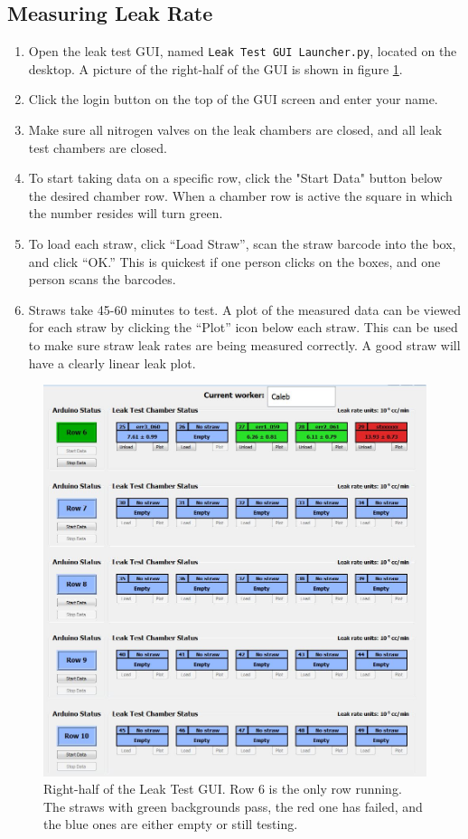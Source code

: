 \documentclass[A4,12pt]{article}
\begin{document}
\subsection{Measuring Leak Rate}
	\begin{enumerate}
    	\item Open the leak test GUI, named {\tt Leak Test GUI Launcher.py}, located on the desktop.  A picture of the right-half of the GUI is shown in figure \ref{GUI}.
        \item Click the login button on the top of the GUI screen and enter your name.
        \item Make sure all nitrogen valves on the leak chambers are closed, and all leak test chambers are closed.
        \item To start taking data on a specific row, click the "Start Data" button below the desired chamber row.  When a chamber row is active the square in which the number resides will turn green.
        \item To load each straw, click ``Load Straw'', scan the straw barcode into the box, and click ``OK.'' This is quickest if one person clicks on the boxes, and one person scans the barcodes.
        \item Straws take 45-60 minutes to test.  A plot of the measured data can be viewed for each straw by clicking the ``Plot'' icon below each straw. This can be used to make sure straw leak rates are being measured correctly. A good straw will have a clearly linear leak plot.
        \end{enumerate}

\begin{figure}[ht]
	\center
	\includegraphics[scale=0.5]{GUI}
	\caption{Right-half of the Leak Test GUI.  Row 6 is the only row running.  The straws with green backgrounds pass, the red one has failed, and the blue ones are either empty or still testing.} \label{GUI}
\end{figure}
\end{document}
